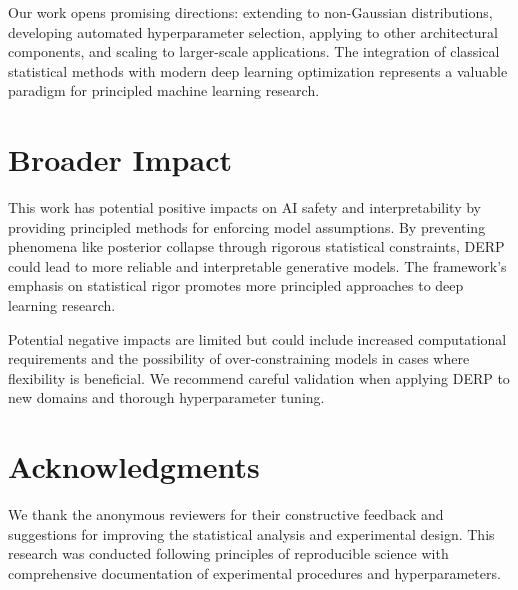 \documentclass{article}
\begin{document}
Our work opens promising directions: extending to non-Gaussian distributions, developing automated hyperparameter selection, applying to other architectural components, and scaling to larger-scale applications. The integration of classical statistical methods with modern deep learning optimization represents a valuable paradigm for principled machine learning research.

\section*{Broader Impact}

This work has potential positive impacts on AI safety and interpretability by providing principled methods for enforcing model assumptions. By preventing phenomena like posterior collapse through rigorous statistical constraints, DERP could lead to more reliable and interpretable generative models. The framework's emphasis on statistical rigor promotes more principled approaches to deep learning research.

Potential negative impacts are limited but could include increased computational requirements and the possibility of over-constraining models in cases where flexibility is beneficial. We recommend careful validation when applying DERP to new domains and thorough hyperparameter tuning.

\section*{Acknowledgments}

We thank the anonymous reviewers for their constructive feedback and suggestions for improving the statistical analysis and experimental design. This research was conducted following principles of reproducible science with comprehensive documentation of experimental procedures and hyperparameters.

\small


\end{document}
